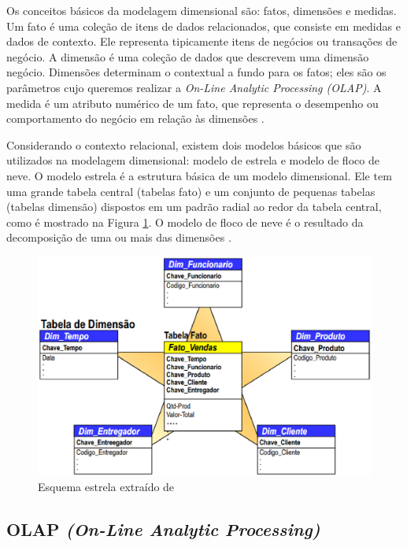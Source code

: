 Os conceitos básicos da modelagem dimensional são: fatos, dimensões e medidas. Um fato é uma coleção de itens de dados relacionados, que consiste em medidas e dados de contexto. Ele representa tipicamente itens de negócios ou transações de negócio. A dimensão é uma coleção de dados que descrevem uma dimensão negócio. Dimensões determinam o contextual a fundo para os fatos; eles são os parâmetros cujo queremos realizar a \textit{On-Line Analytic Processing (OLAP)}. A medida é um atributo numérico de um fato, que representa o desempenho ou comportamento do negócio em relação às dimensões \cite{marotta2000}.

Considerando o contexto relacional, existem dois modelos básicos que são utilizados na modelagem dimensional: modelo de estrela e modelo de floco de neve. O modelo estrela é a estrutura básica de um modelo dimensional. Ele tem uma grande tabela central (tabelas fato) e um conjunto de pequenas tabelas (tabelas dimensão) dispostos em um padrão radial 
ao redor da tabela central, como é mostrado na Figura \ref{fig:estrela}. O modelo de floco de neve é o resultado da decomposição de uma ou mais das dimensões \cite{marotta2000}.
 
\begin{figure}[h!]
\centering
\includegraphics[keepaspectratio=false,scale=0.50]{figuras/figuras_nilton/star.eps}
\caption{Esquema estrela extraído de }
\label{fig:estrela}
\end{figure}
\FloatBarrier
 
\subsection{OLAP \textit{(On-Line Analytic Processing)}}

